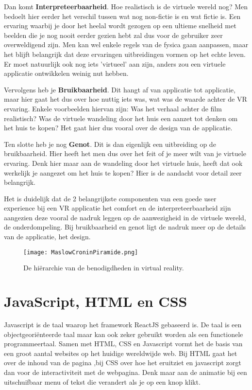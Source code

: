 Dan komt \textbf{Interpreteerbaarheid}. Hoe realistisch is de virtuele wereld nog? Men bedoelt hier eerder het verschil tussen wat nog non-fictie is en wat fictie is. Een ervaring waarbij je door het heelal wordt gezogen op een ultieme snelheid met beelden die je nog nooit eerder gezien hebt zal dus voor de gebruiker zeer overweldigend zijn. Men kan wel enkele regels van de fysica gaan aanpassen, maar het blijft belangrijk dat deze ervaringen uitbreidingen vormen op het echte leven. Er moet natuurlijk ook nog iets 'virtueel' aan zijn, anders zou een virtuele applicatie ontwikkelen weinig nut hebben.

Vervolgens heb je \textbf{Bruikbaarheid}. Dit hangt af van applicatie tot applicatie, maar hier gaat het dus over hoe nuttig iets was, wat was de waarde achter de VR ervaring. Enkele voorbeelden hiervan zijn: Was het verhaal achter de film realistisch? Was de virtuele wandeling door het huis een aanzet tot denken om het huis te kopen? Het gaat hier dus vooral over de design van de applicatie.

Ten slotte heb je nog \textbf{Genot}. Dit is dan eigenlijk een uitbreiding op de bruikbaarheid. Hier heeft het men dus over het feit of je meer wilt van je virtuele ervaring. Denk hier maar aan de wandeling door het virtuele huis, heeft dat ook werkelijk je aangezet om het huis te kopen? Hier is de aandacht voor detail zeer belangrijk.

Het is duidelijk dat de 2 belangrijkste componenten van een goede user experience bij een VR applicatie het comfort en de interpreteerbaarheid zijn aangezien deze vooral de nadruk leggen op de aanwezigheid in de virtuele wereld, de onderdompeling. Bij bruikbaarheid en genot ligt de nadruk meer op de details van de applicatie, het design.

\begin{figure}
	\centering
	\texttt{[image: MaslowCroninPiramide.png]}
	\caption{De hiërarchie van de benodigdheden in virtual reality.}
	\label{fig:maslowcroninpiramide}
\end{figure}

\section{JavaScript, HTML en CSS}
\label{sec:frameworks}
Javascript is de taal waarop het framework ReactJS gebaseerd is. De taal is een objectgeoriënteerde taal maar kan ook zeker gebruikt worden als een functionele programmeertaal. Samen met HTML, CSS en Javascript vormt het de basis van een groot aantal websites op het huidige wereldwijde web. Bij HTML gaat het over de inhoud van de pagina ,bij CSS over hoe het eruitziet en javascript zorgt dan voor de interactiviteit met de webpagina. Denk maar aan de animatie bij een uitschuifbaar menu of tekst die verandert als je op een knop klikt.

